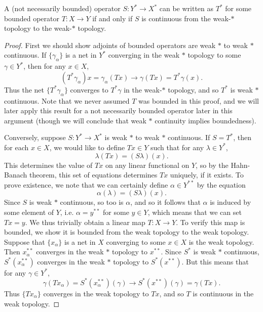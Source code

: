 \begin{theorem}
    A (not necessarily bounded) operator $S: Y^* \to X^*$ can be written as $T^*$ for some bounded operator $T: X \to Y$ if and only if $S$ is continuous from the weak-$*$ topology to the weak-$*$ topology.
\end{theorem}
\begin{proof}
    First we should show adjoints of bounded operators are weak $*$ to weak $*$ continuous. If $\{ \gamma_\alpha \}$ is a net in $Y^*$ converging in the weak $*$ topology to some $\gamma \in Y^*$, then for any $x \in X$,
    \[ (T^* \gamma_\alpha) x = \gamma_\alpha (Tx) \to \gamma(Tx) = T^* \gamma(x). \]
    Thus the net $\{ T^* \gamma_\alpha \}$ converges to $T^* \gamma$ in the weak-$*$ topology, and so $T^*$ is weak $*$ continuous. Note that we never assumed $T$ was bounded in this proof, and we will later apply this result for a not necessarily bounded operator later in this argument (though we will conclude that weak $*$ continuity implies boundedness).

    Conversely, suppose $S: Y^* \to X^*$ is weak $*$ to weak $*$ continuous. If $S = T^*$, then for each $x \in X$, we would like to define $Tx \in Y$ such that for any $\lambda \in Y^*$,
    \[ \lambda(Tx) = (S\lambda)(x). \]
    This determines the value of $Tx$ on any linear functional on $Y$, so by the Hahn-Banach theorem, this set of equations determines $Tx$ uniquely, if it exists. To prove existence, we note that we can certainly define $\alpha \in Y^{**}$ by the equation
    \[ \alpha(\lambda) = (S\lambda)(x). \]
    Since $S$ is weak $*$ continuous, so too is $\alpha$, and so it follows that $\alpha$ is induced by some element of $Y$, i.e. $\alpha = y^{**}$ for some $y \in Y$, which means that we can set $Tx = y$. We thus trivially obtain a linear map $T: X \to Y$. To verify this map is bounded, we show it is bounded from the weak topology to the weak topology. Suppose that $\{ x_\alpha \}$ is a net in $X$ converging to some $x \in X$ is the weak topology. Then $x_\alpha^{**}$ converges in the weak $*$ topology to $x^{**}$. Since $S^*$ is weak $*$ continuous, $S^*(x_\alpha^{**})$ converges in the weak $*$ topology to $S^*(x^{**})$. But this means that for any $\gamma \in Y^*$,
    \[ \gamma(Tx_\alpha) = S^*(x_\alpha^{**})(\gamma) \to S^*(x^{**})(\gamma) = \gamma(Tx). \]
    Thus $\{ Tx_\alpha \}$ converges in the weak topology to $Tx$, and so $T$ is continuous in the weak topology.
\end{proof}

